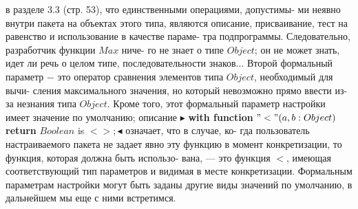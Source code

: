 в  разделе  3.3  (стр.  53),  что  единственными  операциями,  допустимы-\linebreak
ми неявно внутри пакета на объектах этого типа, являются описание,\linebreak
присваивание,  тест  на  равенство  и  использование  в  качестве  параме-\linebreak
тра  подпрограммы.  Следовательно,  разработчик  функции $Max$ ниче-\linebreak
го  не  знает  о  типе $Object$; он  не  может знать,  идет  ли  речь  о  целом\linebreak
типе,  последовательности  знаков...  Второй  формальный  параметр $-$\linebreak
это оператор сравнения элементов типа $Object$, необходимый для вычи-\linebreak
сления максимального значения,  но который невозможно прямо ввести\linebreak
из-за  незнания  типа $Object$. Кроме  того,  этот  формальный  параметр\linebreak
настройки  имеет  значение  по  умолчанию;  описание $\blacktriangleright$ \textbf{with function}\linebreak
$"<" (a,b : Object)$ \textbf{return} $Boolean$ is $<>; \blacktriangleleft$ означает,  что в случае,  ко-\linebreak
гда пользователь настраиваемого пакета не задает явно эту  функцию\linebreak
в момент конкретизации, то функция, которая должна быть использо-\linebreak
вана, — это функция $<$, имеющая соответствующий тип параметров и\linebreak
видимая в  месте  конкретизации.  Формальным параметрам настройки\linebreak
\newpage
\noindent
могут быть заданы другие виды значений по умолчанию, в дальнейшем\linebreak
мы еще с ними встретимся.\\

